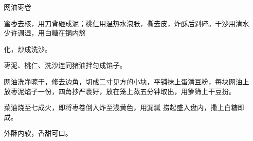 \begin{recipe}{网油枣卷}

\ingredients


\cooking

\step 蜜枣去核，用刀背砸成泥；桃仁用温热水泡胀，撕去皮，炸酥后剁碎。干沙用清水少许调湿，用白糖在锅内熬

化，炒成洗沙。

\step 枣泥、桃仁、洗沙连同猪油拌匀成馅子。

\step 网油洗净晾干，修去边角，切成二寸见方的小块，平铺抹上蛋清豆粉，每块网油上放枣泥焰子一份，四角抄严裹好，放在笼上蒸五分钟取出，用箩筛上干豆扮。

菜油烧至七成火，即将枣卷倒入炸至浅黄色，用漏瓢 捞起盛入盘内，撒上白糖即成。

\notes

外酥内软，香甜可口。

\end{recipe}

